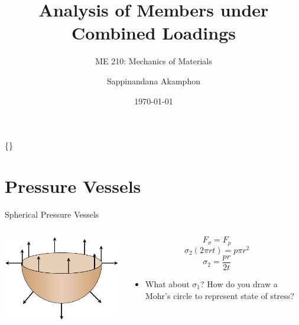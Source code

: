 \documentclass[10pt, svgnames]{beamer}
\author{Sappinandana Akamphon}
\date{\today}
\title{Analysis of Members under Combined Loadings}
\subtitle{ME 210: Mechanics of Materials}
\institute{Department of Mechanical Engineering, TSE}
\date{}
\begin{document}
\begin{frame}[label={sec:orgfb04458}]{\{\}}
\maketitle
\end{frame}

\section{Pressure Vessels}
\label{sec:org0122df3}

\begin{frame}[label={sec:orgfaea732}]{Spherical Pressure Vessels}
\begin{columns}
\begin{column}{0.5\columnwidth}
\begin{center}
\includegraphics[height=0.4\textheight]{pictures/sphere-pressure-vessel.pdf}
\end{center}
\end{column}

\begin{column}{0.5\columnwidth}
$$ F_{\sigma} = F_p $$
$$ \sigma_2 \left( 2\pi r t \right) = p \pi r^2 $$
$$ \sigma_2 = \frac{pr}{2t} $$

\begin{itemize}
\item What about \(\sigma_1\)? How do you draw a Mohr's circle to represent state of stress?
\end{itemize}
\end{column}
\end{columns}
\end{frame}
\end{document}
